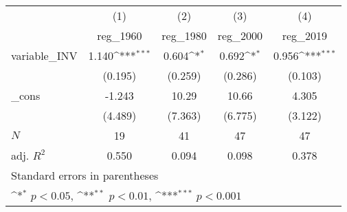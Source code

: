\documentclass[12pt]{article}
\begin{document}
{
\def\sym#1{\ifmmode^{#1}\else\(^{#1}\)\fi}
\begin{tabular}{l*{4}{c}}
\hline\hline
            &\multicolumn{1}{c}{(1)}&\multicolumn{1}{c}{(2)}&\multicolumn{1}{c}{(3)}&\multicolumn{1}{c}{(4)}\\
            &\multicolumn{1}{c}{reg\_1960}&\multicolumn{1}{c}{reg\_1980}&\multicolumn{1}{c}{reg\_2000}&\multicolumn{1}{c}{reg\_2019}\\
\hline
variable\_INV&       1.140\sym{***}&       0.604\sym{*}  &       0.692\sym{*}  &       0.956\sym{***}\\
            &     (0.195)         &     (0.259)         &     (0.286)         &     (0.103)         \\
[1em]
\_cons      &      -1.243         &       10.29         &       10.66         &       4.305         \\
            &     (4.489)         &     (7.363)         &     (6.775)         &     (3.122)         \\
\hline
\(N\)       &          19         &          41         &          47         &          47         \\
adj. \(R^{2}\)&       0.550         &       0.094         &       0.098         &       0.378         \\
\hline\hline
\multicolumn{5}{l}{\footnotesize Standard errors in parentheses}\\
\multicolumn{5}{l}{\footnotesize \sym{*} \(p<0.05\), \sym{**} \(p<0.01\), \sym{***} \(p<0.001\)}\\
\end{tabular}
}
\end{document}

